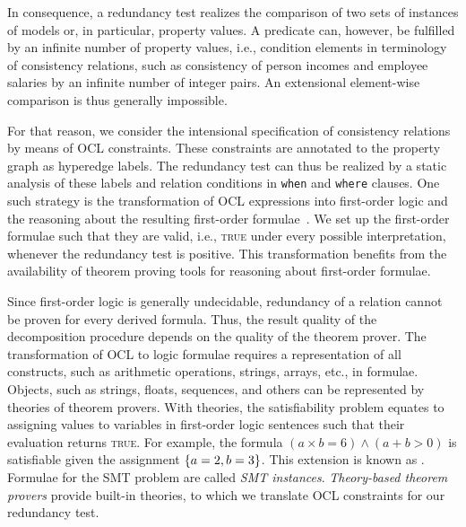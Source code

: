 In consequence, a redundancy test realizes the comparison of two sets of instances of models or, in particular, property values.
A predicate can, however, be fulfilled by an infinite number of property values, i.e., condition elements in terminology of consistency relations, such as consistency of person incomes and employee salaries by an infinite number of integer pairs.
An extensional element-wise comparison is thus generally impossible.

For that reason, we consider the intensional specification of consistency relations by means of \gls{OCL} constraints.
These constraints are annotated to the property graph as hyperedge labels.
The redundancy test can thus be realized by a static analysis of these labels and \qvtr relation conditions in \texttt{when} and \texttt{where} clauses.
One such strategy is the transformation of \gls{OCL} expressions into first-order logic and the reasoning about the resulting first-order formulae~\cite{beckert2002ocltranslation, berardi2005umlreasoning}.
We set up the first-order formulae such that they are valid, i.e., \textsc{true} under every possible interpretation, whenever the redundancy test is positive.
This transformation benefits from the availability of theorem proving tools for reasoning about first-order formulae.

Since first-order logic is generally undecidable, redundancy of a relation cannot be proven for every derived formula.
Thus, the result quality of the decomposition procedure depends on the quality of the theorem prover.
The transformation of \gls{OCL} to logic formulae requires a representation of all constructs, such as arithmetic operations, strings, arrays, etc., in formulae.
Objects, such as strings, floats, sequences, and others can be represented by theories of theorem provers.
With theories, the satisfiability problem equates to assigning values to variables in first-order logic sentences such that their evaluation returns \textsc{true}.
For example, the formula $(a \times b = 6) \land (a + b > 0)$ is satisfiable given the assignment $\{ a = 2, b = 3 \}$.
This extension is known as .
Formulae for the \gls{SMT} problem are called \emph{\gls{SMT} instances}.
\emph{Theory-based theorem provers} provide built-in theories, to which we translate \gls{OCL} constraints for our redundancy test.

